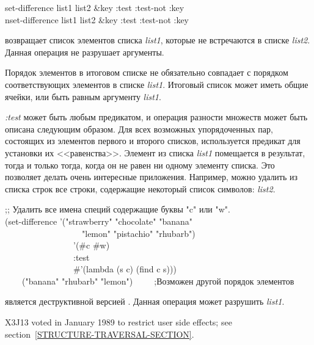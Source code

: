\begin{defun}[Функция]
set-difference list1 list2 &key :test :test-not :key \\
nset-difference list1 list2 &key :test :test-not :key

 возвращает список элементов списка \emph{list1}, которые не
встречаются в списке \emph{list2}. Данная операция не разрушает аргументы.

Порядок элементов в итоговом списке не обязательно совпадает с порядком
соответствующих элементов в списке \emph{list1}.
Итоговый список может иметь общие ячейки, или быть равным  аргументу
\emph{list1}.

\emph{:test} может быть любым предикатом, и операция разности множеств может
быть описана следующим образом. Для всех возможных упорядоченных пар,
состоящих из элементов первого и второго списков, используется предикат для
установки их <<равенства>>. Элемент из списка \emph{list1} помещается в
результат, тогда и только тогда, когда он не равен ни одному элементу списка. Это
позволяет делать очень интересные приложения.
Например, можно удалить из списка строк все строки, содержащие некоторый список символов:
\emph{list2}.
\begin{lisp}
;; Удалить все имена специй содержащие буквы "c" или "w". \\
(set-difference '("strawberry" "chocolate" "banana" \\
~~~~~~~~~~~~~~~~~~"lemon" "pistachio" "rhubarb") \\
~~~~~~~~~~~~~~~~'(\#{\Xbackslash}c \#{\Xbackslash}w) \\
~~~~~~~~~~~~~~~~:test \\
~~~~~~~~~~~~~~~~\#'(lambda (s c) (find c s))) \\
~~~\EV\ ("banana" "rhubarb" "lemon")~~~~~;\textrm{Возможен другой порядок
  элементов}
\end{lisp}

 является деструктивной версией
. Данная операция может разрушить \emph{list1}.

\begin{new}
X3J13 voted in January 1989
to restrict user side effects; see section~\ref{STRUCTURE-TRAVERSAL-SECTION}.
\end{new}
\end{defun}

